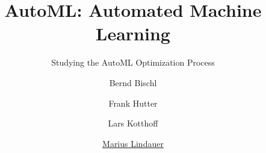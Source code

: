 




\title[AutoML: Overview]{AutoML: Automated Machine Learning}
\subtitle{Studying the AutoML Optimization Process}
\author[Marius Lindauer]{Bernd Bischl \and Frank Hutter \and Lars Kotthoff \and \underline{Marius Lindauer}}
\institute{}
\date{}





	
	\maketitle
	

